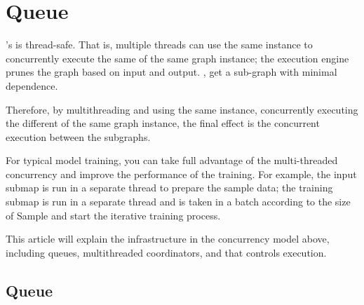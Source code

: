 \begin{savequote}[45mm]
\end{savequote}

\chapter{Queue} 
\label{ch:queue}

\begin{content}

's  is thread-safe. That is, multiple threads can use the same  instance to concurrently execute the same  of the same graph instance; the  execution engine prunes the graph based on input and output. , get a sub-graph with minimal dependence.

Therefore, by multithreading and using the same  instance, concurrently executing the different  of the same graph instance, the final effect is the concurrent execution between the subgraphs.

For typical model training, you can take full advantage of the  multi-threaded concurrency and improve the performance of the training. For example, the input submap is run in a separate thread to prepare the sample data; the training submap is run in a separate thread and is taken in a batch according to the size of  Sample and start the iterative training process.

This article will explain the infrastructure in the concurrency model above, including queues, multithreaded coordinators, and  that controls  execution.

\end{content}

\section{Queue}

